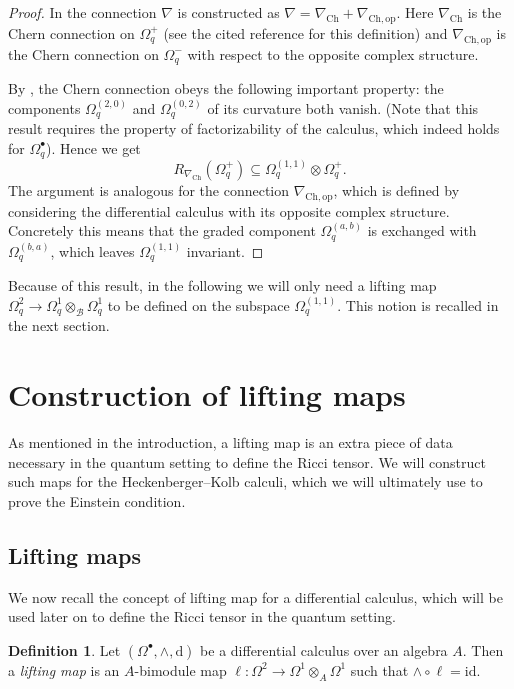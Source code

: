 \documentclass[a4paper,12pt,reqno,english]{amsart}
\numberwithin{equation}{section}
\numberwithin{figure}{section}
\theoremstyle{plain}
\theoremstyle{plain}
\theoremstyle{plain}
\theoremstyle{plain}
\theoremstyle{plain}
\theoremstyle{definition}
\newtheorem{definition}[theorem]{Definition}
\theoremstyle{definition}
\theoremstyle{definition}
\theoremstyle{remark}
\theoremstyle{definition}
\newcommand{\qalg}{\mathcal{B}}
\newcommand{\id}{\mathrm{id}}
\newcommand{\diff}{\mathrm{d}}
\newcommand{\liftmap}{\ell}
\newcommand{\diffcalc}{\Omega_q}
\newcommand{\wedgemap}{\mathord{\wedge}}
\begin{document}
\begin{proof}
In \cite[Theorem 6.14]{levicivita-irreducible} the connection $\nabla$ is constructed as $\nabla = \nabla_{\mathrm{Ch}} + \nabla_{\mathrm{Ch, op}}$.
Here $\nabla_{\mathrm{Ch}}$ is the Chern connection on $\diffcalc^+$ (see the cited reference for this definition) and $\nabla_{\mathrm{Ch, op}}$ is the Chern connection on $\diffcalc^-$ with respect to the opposite complex structure.

By \cite[Theorem 5.3]{quantum-book}, the Chern connection obeys the following important property: the components $\diffcalc^{(2, 0)}$ and $\diffcalc^{(0, 2)}$ of its curvature both vanish.
(Note that this result requires the property of factorizability of the calculus, which indeed holds for $\diffcalc^\bullet$).
Hence we get
\[
R_{\nabla_{\mathrm{Ch}}}(\diffcalc^+) \subseteq \diffcalc^{(1, 1)} \otimes \diffcalc^+.
\]
The argument is analogous for the connection $\nabla_{\mathrm{Ch, op}}$, which is defined by considering the differential calculus with its opposite complex structure.
Concretely this means that the graded component $\diffcalc^{(a, b)}$ is exchanged with $\diffcalc^{(b, a)}$, which leaves $\diffcalc^{(1, 1)}$ invariant.
\end{proof}

Because of this result, in the following we will only need a lifting map $\diffcalc^2 \to \diffcalc^1 \otimes_\qalg \diffcalc^1$ to be defined on the subspace $\diffcalc^{(1, 1)}$.
This notion is recalled in the next section.

\section{Construction of lifting maps}
\label{sec:lifting-maps}

As mentioned in the introduction, a lifting map is an extra piece of data necessary in the quantum setting to define the Ricci tensor.
We will construct such maps for the Heckenberger--Kolb calculi, which we will ultimately use to prove the Einstein condition.

\subsection{Lifting maps}

We now recall the concept of lifting map for a differential calculus, which will be used later on to define the Ricci tensor in the quantum setting.

\begin{definition}
Let $(\Omega^\bullet, \wedgemap, \diff)$ be a differential calculus over an algebra $A$.
Then a \emph{lifting map} is an $A$-bimodule map $\liftmap: \Omega^2 \to \Omega^1 \otimes_A \Omega^1$ such that $\wedgemap \circ \liftmap = \id$.
\end{definition}
\end{document}
